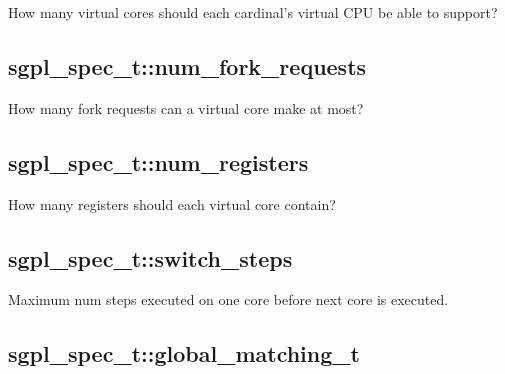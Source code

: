How many virtual cores should each cardinal's virtual CPU be able to support?

\subsection{sgpl\_spec\_t::num\_fork\_requests}


How many fork requests can a virtual core make at most?

\subsection{sgpl\_spec\_t::num\_registers}


How many registers should each virtual core contain?

\subsection{sgpl\_spec\_t::switch\_steps}


Maximum num steps executed on one core before next core is executed.

\subsection{sgpl\_spec\_t::global\_matching\_t}

